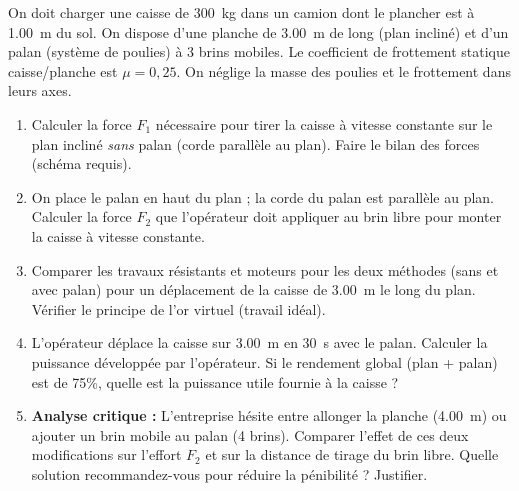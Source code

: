 \documentclass[11pt]{article}
\begin{document}
\begin{exercice}
On doit charger une caisse de \SI{300}{kg} dans un camion dont le plancher est \`a \SI{1,00}{m} du sol. On dispose d'une planche de \SI{3,00}{m} de long (plan inclin\'e) et d'un palan (syst\`eme de poulies) à 3 brins mobiles. Le coefficient de frottement statique caisse/planche est $\mu = 0,25$. On n\'eglige la masse des poulies et le frottement dans leurs axes.
\begin{enumerate}
    \item Calculer la force $F_1$ n\'ecessaire pour tirer la caisse \`a vitesse constante sur le plan inclin\'e \textit{sans} palan (corde parall\`ele au plan). Faire le bilan des forces (sch\'ema requis).
    \item On place le palan en haut du plan ; la corde du palan est parall\`ele au plan. Calculer la force $F_2$ que l'op\'erateur doit appliquer au brin libre pour monter la caisse \`a vitesse constante.
    \item Comparer les travaux r\'esistants et moteurs pour les deux m\'ethodes (sans et avec palan) pour un d\'eplacement de la caisse de \SI{3,00}{m} le long du plan. V\'erifier le principe de l'or virtuel (travail id\'eal).
    \item L'op\'erateur d\'eplace la caisse sur \SI{3,00}{m} en \SI{30}{s} avec le palan. Calculer la puissance d\'evelopp\'ee par l'op\'erateur. Si le rendement global (plan + palan) est de 75\%, quelle est la puissance utile fournie \`a la caisse ?
    \item \textbf{Analyse critique :} L'entreprise h\'esite entre allonger la planche (\SI{4,00}{m}) ou ajouter un brin mobile au palan (4 brins). Comparer l'effet de ces deux modifications sur l'effort $F_2$ et sur la distance de tirage du brin libre. Quelle solution recommandez-vous pour r\'eduire la p\'enibilit\'e ? Justifier.
\end{enumerate}
\end{exercice}
\end{document}
